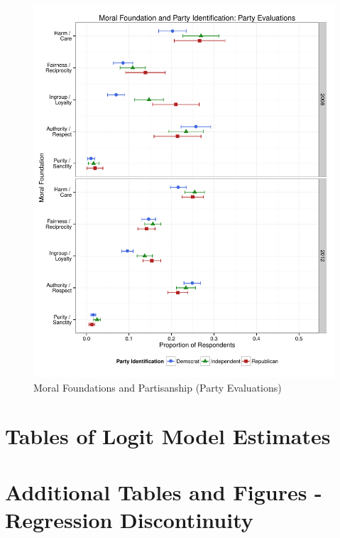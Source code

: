 \documentclass[12pt]{article}
\begin{document}
\begin{figure}[ht]\centering
\includegraphics[scale=.4]{../calc/fig/a3_mft_pid_pa.pdf}
\caption{Moral Foundations and Partisanship (Party Evaluations)}\label{fig:a3_mft_pid_pa}
\end{figure}


\clearpage
\section{Tables of Logit Model Estimates}
\renewcommand\thefigure{\thesection.\arabic{figure}}
\renewcommand\thetable{\thesection.\arabic{table}}
\setcounter{figure}{0}
\setcounter{table}{0}







\clearpage
\section{Additional Tables and Figures - Regression Discontinuity}
\renewcommand\thefigure{\thesection.\arabic{figure}}
\renewcommand\thetable{\thesection.\arabic{table}}
\setcounter{figure}{0}
\setcounter{table}{0}
\end{document}
